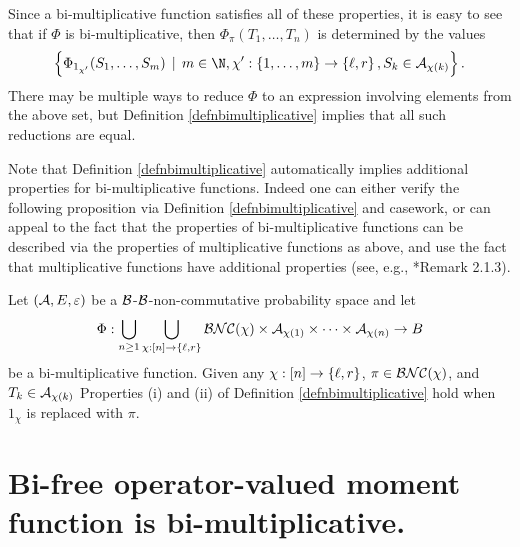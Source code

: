 Since a bi-multiplicative function satisfies all of these properties, it is easy to see that if $\Phi$ is bi-multiplicative, then $\Phi_\pi(T_1, \ldots, T_n)$ is determined by the values 
\[
	\set{\Phi_{1_{\chi'}}(S_1, \ldots, S_m) \, \mid \, m \in \N, \chi' : \set{1,\ldots, m} \to \slr, S_k \in \A_{\chi(k)}}.
\]
There may be multiple ways to reduce $\Phi$ to an expression involving elements from the above set, but Definition \ref{defnbimultiplicative} implies that all such reductions are equal.

Note that Definition \ref{defnbimultiplicative} automatically implies additional properties for bi-multiplicative functions.
Indeed one can either verify the following proposition via Definition \ref{defnbimultiplicative} and casework, or can appeal to the fact that the properties of bi-multiplicative functions can be described via the properties of multiplicative functions as above, and use the fact that multiplicative functions have additional properties (see, e.g., \cite{speicher1998combinatorial}*{Remark 2.1.3}).

\begin{proposition}
	\label{propenhancedproperties}
	Let $(\mathcal{A}, E, \varepsilon)$ be a $\mathcal{B}$-$\mathcal{B}$-non-commutative probability space and let
	\[
		\Phi : \bigcup_{n\geq 1} \bigcup_{\chi : [n] \to \left\{\ell, r\right\}} \mathcal{BNC}(\chi) \times \mathcal{A}_{\chi(1)} \times \cdots \times \mathcal{A}_{\chi(n)} \to B
	\]
	be a bi-multiplicative function.
	Given any $\chi : [n] \to \left\{\ell, r\right\}$, $\pi \in \mathcal{BNC}(\chi)$, and $T_k \in \mathcal{A}_{\chi(k)}$ Properties (i) and (ii) of Definition \ref{defnbimultiplicative} hold when $1_\chi$ is replaced with $\pi$.
\end{proposition}
















\section{Bi-free operator-valued moment function is bi-multiplicative.}
\label{sec:verifyingrecursivedefinitionfromuniversalpolynomialshasdesiredproperties}

